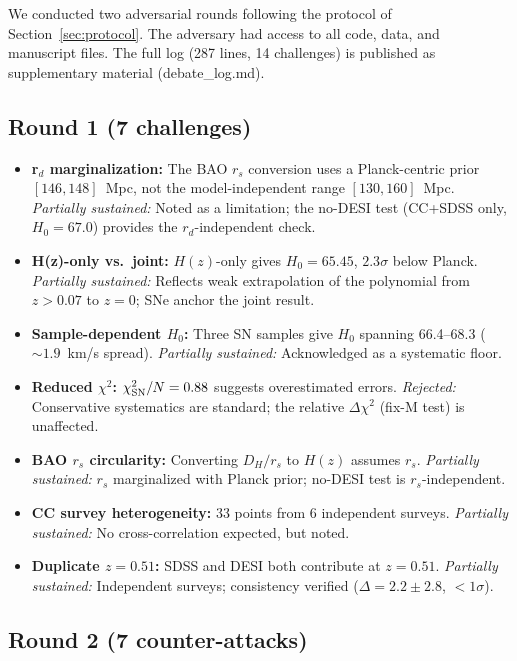 \documentclass[twocolumn]{aastex631}
\begin{document}
We conducted two adversarial rounds following the protocol of
Section~\ref{sec:protocol}.  The adversary had access to all code,
data, and manuscript files.  The full log (287 lines, 14 challenges)
is published as supplementary material (debate\_log.md).

\subsection{Round 1 (7 challenges)}

\begin{itemize}
  \item \textbf{r$_d$ marginalization:} The BAO $r_s$ conversion uses a
        Planck-centric prior $[146,148]$~Mpc, not the model-independent
        range $[130,160]$~Mpc.
        \emph{Partially sustained:} Noted as a limitation; the no-DESI
        test (CC+SDSS only, $H_0=67.0$) provides the
        $r_d$-independent check.
  \item \textbf{H(z)-only vs.\ joint:} $H(z)$-only gives $H_0=65.45$,
        $2.3\sigma$ below Planck.
        \emph{Partially sustained:} Reflects weak extrapolation of the
        polynomial from $z>0.07$ to $z=0$; SNe anchor the joint result.
  \item \textbf{Sample-dependent $H_0$:} Three SN samples give $H_0$
        spanning 66.4--68.3 ($\sim1.9$~km/s spread).
        \emph{Partially sustained:} Acknowledged as a systematic floor.
  \item \textbf{Reduced $\chi^2$:} $\chi^2_{\rm SN}/N=0.88$ suggests
        overestimated errors.
        \emph{Rejected:} Conservative systematics are standard; the
        relative $\Delta\chi^2$ (fix-M test) is unaffected.
  \item \textbf{BAO $r_s$ circularity:} Converting $D_H/r_s$ to $H(z)$
        assumes $r_s$.
        \emph{Partially sustained:} $r_s$ marginalized with Planck prior;
        no-DESI test is $r_s$-independent.
  \item \textbf{CC survey heterogeneity:} 33 points from 6 independent
        surveys.
        \emph{Partially sustained:} No cross-correlation expected,
        but noted.
  \item \textbf{Duplicate $z=0.51$:} SDSS and DESI both contribute at
        $z=0.51$.
        \emph{Partially sustained:} Independent surveys; consistency
        verified ($\Delta=2.2\pm2.8$, $<1\sigma$).
\end{itemize}

\subsection{Round 2 (7 counter-attacks)}
\end{document}
